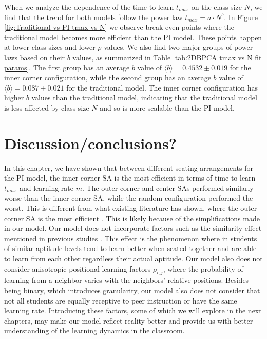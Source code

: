 When we analyze the dependence of the time to learn $t_{max}$ on the class size $N$, we find that the trend for both models follow the power law $t_{max} = a \cdot N^b$. 
In Figure \ref{fig:Traditional vs PI tmax vs N} we observe break-even points where the traditional model becomes more efficient than the PI model. 
These points happen at lower class sizes and lower $\rho$ values. We also find two major groups of power laws based on their $b$ values, as summarized in Table \ref{tab:2DBPCA tmax vs N fit params}. 
The first group has an average $b$ value of $\langle b \rangle = 0.4532 \pm 0.019$ for the inner corner configuration, while the second group has an average $b$ value of $\langle b \rangle = 0.087\pm0.021$ for the traditional model. 
The inner corner configuration has higher $b$ values than the traditional model, indicating that the traditional model is less affected by class size $N$ and so is more scalable than the PI model.

\section{Discussion/conclusions?}
In this chapter, we have shown that between different seating arrangements for the PI model, the inner corner SA is the most efficient in terms of time to learn $t_{max}$ and learning rate $m$. 
The outer corner and center SAs performed similarly worse than the inner corner SA, while the random configuration performed the worst. 
This is different from what existing literature has shown, where the outer corner SA is the most efficient \cite{roxas2010seating}. 
This is likely because of the simplifications made in our model. Our model does not incorporate factors such as the similarity effect mentioned in previous studies \cite{roxas2010seating,smith2009peer}. 
This effect is the phenomenon where in students of similar aptitude levels tend to learn better when seated together and are able to learn from each other regardless their actual aptitude. 
Our model also does not consider anisotropic positional learning factors $\rho_{i,j}$, where the probability of learning from a neighbor varies with the neighbors' relative positions. 
Besides being binary, which introduces granularity, our model also does not consider that not all students are equally receptive to peer instruction or have the same learning rate. 
Introducing these factors, some of which we will explore in the next chapters, may make our model reflect reality better and provide us with better understanding of the learning dynamics in the classroom.

